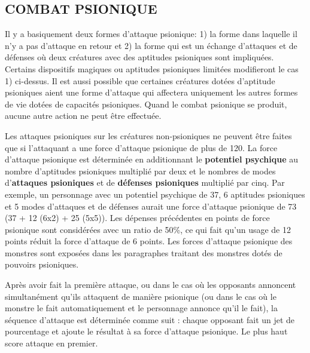 \documentclass[11pt]{article}
\begin{document}
{\subsection*{\normalsize COMBAT PSIONIQUE}

Il y a basiquement deux formes d'attaque psionique: 1) la forme dans laquelle il n'y a pas d'attaque en retour et 2) la forme qui est un échange d'attaques et de défenses où deux créatures avec des aptitudes psioniques sont impliquées. Certains dispositifs magiques ou aptitudes psioniques limitées modifieront le cas 1) ci-dessus. Il est aussi possible que certaines créatures dotées d'aptitude psioniques aient une forme d'attaque qui affectera uniquement les autres formes de vie dotées de capacités psioniques. Quand le combat psionique se produit, aucune autre action ne peut être effectuée.

\medskip

Les attaques psioniques sur les créatures non-psioniques ne peuvent être faites que si l'attaquant a une force d'attaque psionique de plus de 120. La force d'attaque psionique est déterminée en additionnant le \textbf{potentiel psychique} au nombre d'aptitudes psioniques multiplié par deux et le nombres de modes d'\textbf{attaques psioniques} et de \textbf{défenses psioniques} multiplié par cinq. Par exemple, un personnage avec un potentiel psychique de 37, 6 aptitudes psioniques et 5 modes d'attaques et de défenses aurait une force d'attaque psionique de 73 (37 + 12 (6x2) + 25 (5x5)). Les dépenses précédentes en points de force psionique sont considérées avec un ratio de 50\%, ce qui fait qu'un usage de 12 points réduit la force d'attaque de 6 points. Les forces d'attaque psionique des monstres sont exposées dans les paragraphes traitant des monstres dotés de pouvoirs psioniques.

\medskip

Après avoir fait la première attaque, ou dans le cas où les opposants annoncent simultanément qu'ils attaquent de manière psionique (ou dans le cas où le monstre le fait automatiquement et le personnage annonce qu'il le fait), la séquence d'attaque est déterminée comme suit : chaque opposant fait un jet de pourcentage et ajoute le résultat à sa force d'attaque psionique. Le plus haut score attaque en premier.

\bigskip

}
\end{document}
